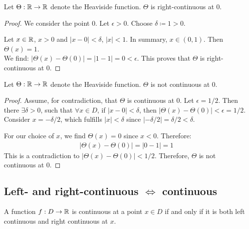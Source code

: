 \begin{theorem}
    Let $\Theta: \mathbb{R} \to \mathbb{R}$ denote the Heaviside function. $\Theta$ is right-continuous at $0$.
\end{theorem}

\begin{proof}
    We consider the point $0$. Let $\epsilon > 0$. Choose $\delta \coloneqq 1 > 0$.

    Let $x \in \mathbb{R}$, $x > 0$ and $|x - 0| < \delta$, \ie $|x| < 1$. In summary, $x\in (0,1)$. Then $\Theta(x) = 1$.\\
    We find: $|\Theta(x) - \Theta(0)| = |1 - 1| = 0 < \epsilon$. This proves that $\Theta$ is right-continuous at $0$.
\end{proof}


\begin{theorem}
    Let $\Theta: \mathbb{R} \to \mathbb{R}$ denote the Heaviside function. $\Theta$ is not continuous at $0$.
\end{theorem}

\begin{proof}
    Assume, for contradiction, that $\Theta$ is continuous at 0. Let $\epsilon = 1/2$. Then there $\exists \delta > 0$, such that $\forall x \in D$, if $|x - 0| < \delta$, then $|\Theta(x) - \Theta(0)| < \epsilon = 1/2$. Consider $\displaystyle x = -\delta/2$, which fulfills $|x| < \delta$ since $|- \delta / 2| = \delta / 2 < \delta$.

    For our choice of $x$, we find $\Theta(x) = 0$ since $x < 0$.
    Therefore:
    \begin{align*}
        |\Theta(x) - \Theta(0)| = |0 - 1| = 1
    \end{align*}
    This is a contradiction to $|\Theta(x) - \Theta(0)| < 1/2$. Therefore, $\Theta$ is not continuous at $0$.
\end{proof}




\pagebreak
\subsection{Left- and right-continuous $\iff$ continuous}

\begin{theorem}
    A function $f : D \to \mathbb{R}$ is continuous at a point $x \in D$ if and only if it is both left continuous and right continuous at $x$.
\end{theorem}

